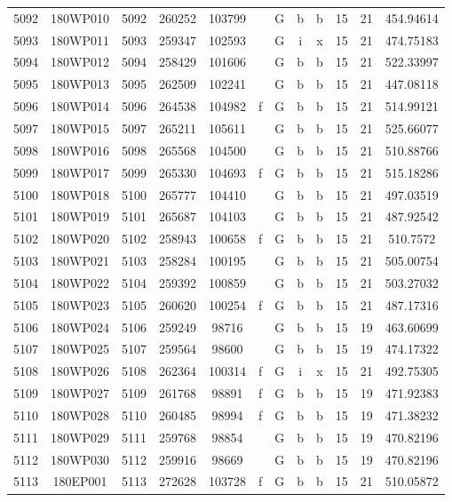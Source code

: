 \begin{tabular}{|*{12}{c|}}
5092 & 180WP010 & 5092 & 260252 & 103799 &  & G & b & b & 15 & 21 & 454.94614 \\ 
5093 & 180WP011 & 5093 & 259347 & 102593 &  & G & i & x & 15 & 21 & 474.75183 \\ 
5094 & 180WP012 & 5094 & 258429 & 101606 &  & G & b & b & 15 & 21 & 522.33997 \\ 
5095 & 180WP013 & 5095 & 262509 & 102241 &  & G & b & b & 15 & 21 & 447.08118 \\ 
5096 & 180WP014 & 5096 & 264538 & 104982 & f & G & b & b & 15 & 21 & 514.99121 \\ 
5097 & 180WP015 & 5097 & 265211 & 105611 &  & G & b & b & 15 & 21 & 525.66077 \\ 
5098 & 180WP016 & 5098 & 265568 & 104500 &  & G & b & b & 15 & 21 & 510.88766 \\ 
5099 & 180WP017 & 5099 & 265330 & 104693 & f & G & b & b & 15 & 21 & 515.18286 \\ 
5100 & 180WP018 & 5100 & 265777 & 104410 &  & G & b & b & 15 & 21 & 497.03519 \\ 
5101 & 180WP019 & 5101 & 265687 & 104103 &  & G & b & b & 15 & 21 & 487.92542 \\ 
5102 & 180WP020 & 5102 & 258943 & 100658 & f & G & b & b & 15 & 21 & 510.7572 \\ 
5103 & 180WP021 & 5103 & 258284 & 100195 &  & G & b & b & 15 & 21 & 505.00754 \\ 
5104 & 180WP022 & 5104 & 259392 & 100859 &  & G & b & b & 15 & 21 & 503.27032 \\ 
5105 & 180WP023 & 5105 & 260620 & 100254 & f & G & b & b & 15 & 21 & 487.17316 \\ 
5106 & 180WP024 & 5106 & 259249 & 98716 &  & G & b & b & 15 & 19 & 463.60699 \\ 
5107 & 180WP025 & 5107 & 259564 & 98600 &  & G & b & b & 15 & 19 & 474.17322 \\ 
5108 & 180WP026 & 5108 & 262364 & 100314 & f & G & i & x & 15 & 21 & 492.75305 \\ 
5109 & 180WP027 & 5109 & 261768 & 98891 & f & G & b & b & 15 & 19 & 471.92383 \\ 
5110 & 180WP028 & 5110 & 260485 & 98994 & f & G & b & b & 15 & 19 & 471.38232 \\ 
5111 & 180WP029 & 5111 & 259768 & 98854 &  & G & b & b & 15 & 19 & 470.82196 \\ 
5112 & 180WP030 & 5112 & 259916 & 98669 &  & G & b & b & 15 & 19 & 470.82196 \\ 
5113 & 180EP001 & 5113 & 272628 & 103728 & f & G & b & b & 15 & 21 & 510.05872 \\ 

\end{tabular}
